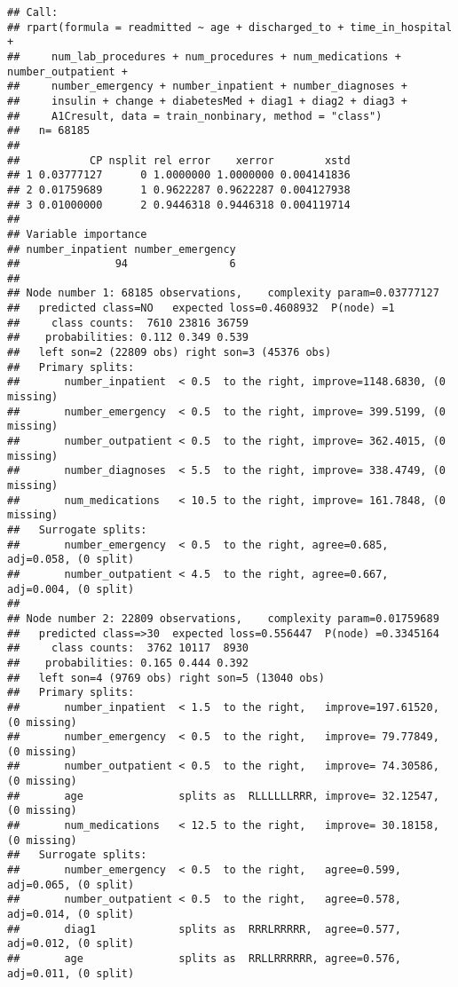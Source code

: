 \documentclass[]{article}
\begin{document}
\begin{verbatim}
## Call:
## rpart(formula = readmitted ~ age + discharged_to + time_in_hospital + 
##     num_lab_procedures + num_procedures + num_medications + number_outpatient + 
##     number_emergency + number_inpatient + number_diagnoses + 
##     insulin + change + diabetesMed + diag1 + diag2 + diag3 + 
##     A1Cresult, data = train_nonbinary, method = "class")
##   n= 68185 
## 
##           CP nsplit rel error    xerror        xstd
## 1 0.03777127      0 1.0000000 1.0000000 0.004141836
## 2 0.01759689      1 0.9622287 0.9622287 0.004127938
## 3 0.01000000      2 0.9446318 0.9446318 0.004119714
## 
## Variable importance
## number_inpatient number_emergency 
##               94                6 
## 
## Node number 1: 68185 observations,    complexity param=0.03777127
##   predicted class=NO   expected loss=0.4608932  P(node) =1
##     class counts:  7610 23816 36759
##    probabilities: 0.112 0.349 0.539 
##   left son=2 (22809 obs) right son=3 (45376 obs)
##   Primary splits:
##       number_inpatient  < 0.5  to the right, improve=1148.6830, (0 missing)
##       number_emergency  < 0.5  to the right, improve= 399.5199, (0 missing)
##       number_outpatient < 0.5  to the right, improve= 362.4015, (0 missing)
##       number_diagnoses  < 5.5  to the right, improve= 338.4749, (0 missing)
##       num_medications   < 10.5 to the right, improve= 161.7848, (0 missing)
##   Surrogate splits:
##       number_emergency  < 0.5  to the right, agree=0.685, adj=0.058, (0 split)
##       number_outpatient < 4.5  to the right, agree=0.667, adj=0.004, (0 split)
## 
## Node number 2: 22809 observations,    complexity param=0.01759689
##   predicted class=>30  expected loss=0.556447  P(node) =0.3345164
##     class counts:  3762 10117  8930
##    probabilities: 0.165 0.444 0.392 
##   left son=4 (9769 obs) right son=5 (13040 obs)
##   Primary splits:
##       number_inpatient  < 1.5  to the right,   improve=197.61520, (0 missing)
##       number_emergency  < 0.5  to the right,   improve= 79.77849, (0 missing)
##       number_outpatient < 0.5  to the right,   improve= 74.30586, (0 missing)
##       age               splits as  RLLLLLLRRR, improve= 32.12547, (0 missing)
##       num_medications   < 12.5 to the right,   improve= 30.18158, (0 missing)
##   Surrogate splits:
##       number_emergency  < 0.5  to the right,   agree=0.599, adj=0.065, (0 split)
##       number_outpatient < 0.5  to the right,   agree=0.578, adj=0.014, (0 split)
##       diag1             splits as  RRRLRRRRR,  agree=0.577, adj=0.012, (0 split)
##       age               splits as  RRLLRRRRRR, agree=0.576, adj=0.011, (0 split)

\end{verbatim}
\end{document}
